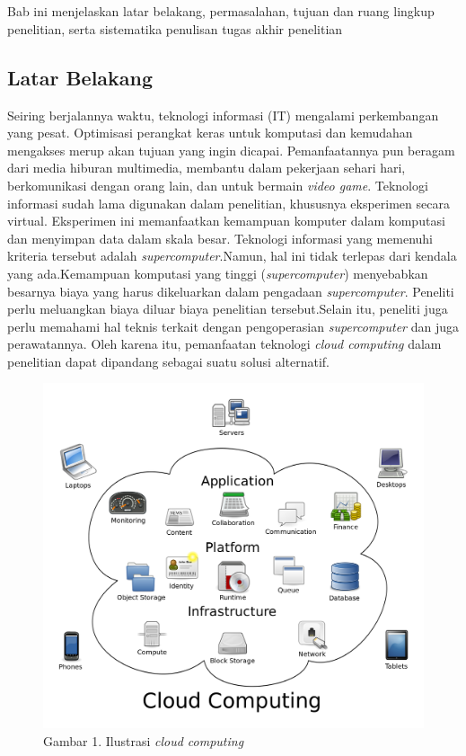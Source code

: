 
\chapter{\babSatu}
Bab ini menjelaskan latar belakang, permasalahan, tujuan dan ruang lingkup 
penelitian, serta sistematika penulisan tugas akhir penelitian 

\section{Latar Belakang}
Seiring berjalannya waktu, teknologi informasi (IT) mengalami perkembangan yang
pesat. Optimisasi perangkat keras untuk komputasi dan kemudahan mengakses merup
akan tujuan yang ingin dicapai. Pemanfaatannya pun beragam dari media hiburan multimedia, membantu dalam
pekerjaan sehari hari, berkomunikasi dengan orang lain, dan untuk bermain \textit{video game}.
Teknologi informasi sudah lama digunakan dalam penelitian, khususnya eksperimen secara virtual. Eksperimen ini memanfaatkan kemampuan komputer dalam komputasi dan menyimpan data dalam skala besar. Teknologi informasi yang memenuhi kriteria tersebut adalah \textit{supercomputer}.Namun, hal ini tidak terlepas dari kendala yang ada.Kemampuan komputasi yang tinggi (\textit{supercomputer}) menyebabkan besarnya biaya yang harus dikeluarkan dalam pengadaan \textit{supercomputer}.
Peneliti perlu meluangkan biaya diluar biaya penelitian tersebut.Selain itu, 
peneliti juga perlu memahami hal teknis terkait dengan pengoperasian \textit{supercomputer} dan juga perawatannya. Oleh karena itu, pemanfaatan teknologi \textit{cloud computing} dalam penelitian dapat dipandang sebagai suatu solusi alternatif.
\begin{figure}
	\centering
	\includegraphics[scale = 0.1]{cloud_computing.png}
	\caption{Gambar 1. Ilustrasi \textit{cloud computing}}
\end{figure}
